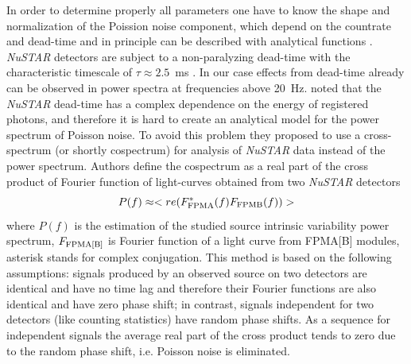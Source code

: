 \documentclass[a4paper,fleqn,usenatbib]{mnras}
\begin{document}
In order to determine properly all parameters one have to know the shape and normalization of the Poission noise component, which depend on the countrate and dead-time and in principle can be described with analytical functions \citep[see, e.g.,][]{1994A&A...287...73V, 1995ApJ...449..930Z}.
{\it NuSTAR} detectors are subject to a non-paralyzing dead-time with the characteristic timescale of $\tau \approx 2.5$~ms \citep{2015ApJ...800..109B}.
In our case effects from dead-time already can be observed in power spectra at frequencies above 20~Hz.
\citet{2015ApJ...800..109B} noted that the {\it NuSTAR} dead-time has a complex dependence on the energy of registered photons, and therefore it is hard to create an analytical model for the power spectrum of Poisson noise. 
To avoid this problem they proposed to use a cross-spectrum (or shortly cospectrum) for analysis of {\it NuSTAR} data instead of the power spectrum. 
Authors define the cospectrum as a real part of the cross product of Fourier function of light-curves obtained from two {\it NuSTAR} detectors 
\begin{equation}
        \label{eq: ps_estimation}
        P(f) \approx <re(F_{\rm FPMA}^{*}(f)F_{\rm FPMB}(f))>
\end{equation}
where $P(f)$ is the estimation of the studied source intrinsic variability power spectrum, $F_{\rm FPMA[B]}$ is Fourier function of a light curve from FPMA[B] modules, asterisk stands for complex conjugation. 
This method is based on the following assumptions: signals produced by an observed source on two detectors are identical and have no time lag and therefore their Fourier functions are also identical and have zero phase shift; in contrast, signals independent for two detectors (like counting statistics) have random phase shifts.  
As a sequence for independent signals the average real part of the cross product tends to zero due to the random phase shift, i.e. Poisson noise is eliminated.
\end{document}
